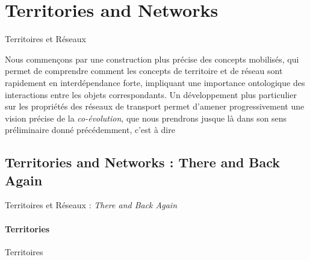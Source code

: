 


\newpage




\section{Territories and Networks}{Territoires et Réseaux}

\label{sec:networkterritories}




Nous commençons par une construction plus précise des concepts mobilisés, qui permet de comprendre comment les concepts de territoire et de réseau sont rapidement en interdépendance forte, impliquant une importance ontologique des interactions entre les objets correspondants. Un développement plus particulier sur les propriétés des réseaux de transport permet d'amener progressivement une vision précise de la \emph{co-évolution}, que nous prendrons jusque là dans son sens préliminaire donné précédemment, c'est à dire 


\subsection{Territories and Networks : There and Back Again}{Territoires et Réseaux : \emph{There and Back Again}}


\paragraph{Territories}{Territoires}


